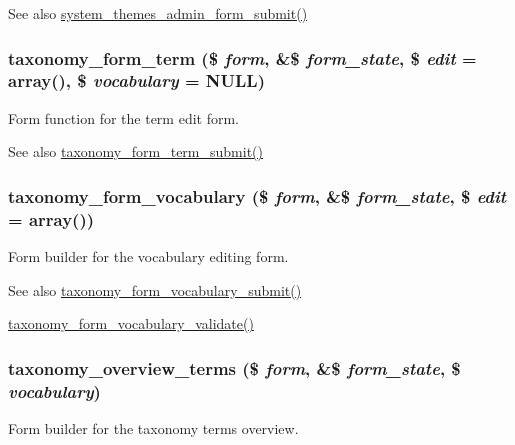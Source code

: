 \begin{DoxySeeAlso}{See also}
\hyperlink{system_8admin_8inc_a9076bd2c2f4ed726578e88c4419785fe}{system\_\-themes\_\-admin\_\-form\_\-submit()} 
\end{DoxySeeAlso}
\hypertarget{group__forms_gadd038edd60ebd00177106bb97841803c}{
\subsubsection[{taxonomy\_\-form\_\-term}]{\setlength{\rightskip}{0pt plus 5cm}taxonomy\_\-form\_\-term (\$ {\em form}, \/  \&\$ {\em form\_\-state}, \/  \$ {\em edit} = {\ttfamily array()}, \/  \$ {\em vocabulary} = {\ttfamily NULL})}}
\label{group__forms_gadd038edd60ebd00177106bb97841803c}
Form function for the term edit form.

\begin{DoxySeeAlso}{See also}
\hyperlink{taxonomy_8admin_8inc_a47414380bfb0caa70eb3d35a7e153ac0}{taxonomy\_\-form\_\-term\_\-submit()} 
\end{DoxySeeAlso}
\hypertarget{group__forms_gafb93f170208a8c9c125b31ac91e1f966}{
\subsubsection[{taxonomy\_\-form\_\-vocabulary}]{\setlength{\rightskip}{0pt plus 5cm}taxonomy\_\-form\_\-vocabulary (\$ {\em form}, \/  \&\$ {\em form\_\-state}, \/  \$ {\em edit} = {\ttfamily array()})}}
\label{group__forms_gafb93f170208a8c9c125b31ac91e1f966}
Form builder for the vocabulary editing form.

\begin{DoxySeeAlso}{See also}
\hyperlink{taxonomy_8admin_8inc_a5fe8d2d826372a29a068cd2c39e38636}{taxonomy\_\-form\_\-vocabulary\_\-submit()} 

\hyperlink{taxonomy_8admin_8inc_afab98304eee771ced13ea3999aa8c5b4}{taxonomy\_\-form\_\-vocabulary\_\-validate()} 
\end{DoxySeeAlso}
\hypertarget{group__forms_gac5a4ddd2115e830118c10b98f464a4ab}{
\subsubsection[{taxonomy\_\-overview\_\-terms}]{\setlength{\rightskip}{0pt plus 5cm}taxonomy\_\-overview\_\-terms (\$ {\em form}, \/  \&\$ {\em form\_\-state}, \/  \$ {\em vocabulary})}}
\label{group__forms_gac5a4ddd2115e830118c10b98f464a4ab}
Form builder for the taxonomy terms overview.

